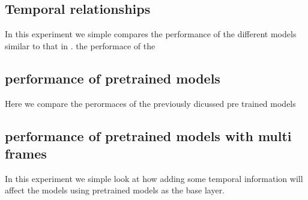     
    \subsection{Temporal relationships}
     In this experiment we simple compares the performance of the different models similar to that in \citep{KarpathyCVPR14}.  the performace of the 
     
    \subsection{performance of pretrained models}
    Here we compare the perormaces of the previously dicussed pre trained models
    
    \subsection{performance of pretrained models with multi frames}
    In this experiment we simple look at how adding some temporal information will affect the models using pretrained models as the base layer.
 
